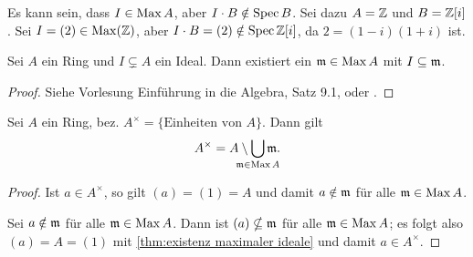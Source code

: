 \documentclass[12pt,a4paper]{scrartcl}
\theoremstyle{cplain}
\theoremstyle{cdef}
\begin{document}
\begin{bem}
	Es kann sein, dass $I \in \operatorname{Max} A$, aber $I \cdot B \notin \operatorname{Spec} B$. Sei dazu $A=\mathbb Z$ und $B=\mathbb Z[i]$. Sei $I=(2) \in \operatorname{Max}(\mathbb Z)$, aber $I \cdot B = (2) \notin \operatorname{Spec} \mathbb Z[i]$, da $2=(1-i)(1+i)$ ist.
\end{bem}
\begin{satz} \label{thm:existenz maximaler ideale}
	Sei $A$ ein Ring und $I \subsetneq A$ ein Ideal. Dann existiert ein $\mathfrak{m} \in \operatorname{Max} A$ mit $I \subseteq \mathfrak{m}$.
	\begin{proof}
		Siehe Vorlesung Einführung in die Algebra, Satz 9.1, oder \cite[Theorem 1.3]{atiyah-macdonald}.
	\end{proof}
\end{satz}
\begin{kor} \label{kor:einheiten und maximale ideale}
    Sei $A$ ein Ring, bez. $A^{\times}=\{\text{Einheiten von }A\}$. Dann gilt \[A^{\times}=A \setminus \bigcup_{\mathclap{\fm \in \Max A}} \fm.\]
	\begin{proof}
		Ist $a \in A^{\times}$, so gilt $(a)=(1)=A$ und damit $a \notin \mathfrak{m}$ für alle $\mathfrak{m} \in \operatorname{Max} A$.

		Sei $a \notin \mathfrak{m}$ für alle $\mathfrak{m} \in \operatorname{Max} A$. Dann ist $(a) \nsubseteq \mathfrak{m}$ für alle $\mathfrak{m} \in \operatorname{Max} A$; es folgt also $(a)=A=(1)$ mit \cref{thm:existenz maximaler ideale} und damit $a \in A^{\times}$.
	\end{proof}
\end{kor}
\end{document}
